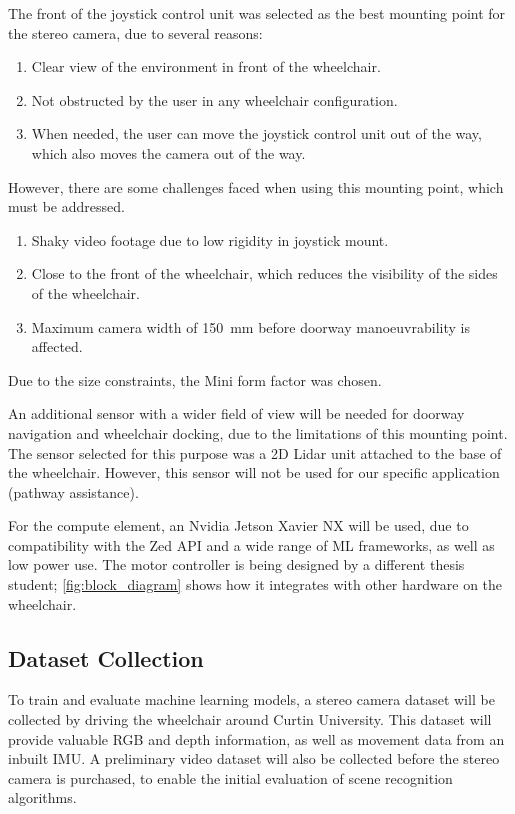 \documentclass[12pt]{article}
\begin{document}
The front of the joystick control unit was selected as the best mounting point for the
stereo camera, due to several reasons:
\begin{enumerate}[topsep=0pt,itemsep=-1ex,partopsep=1ex,parsep=1ex]
    \item Clear view of the environment in front of the wheelchair.
    \item Not obstructed by the user in any wheelchair configuration.
    \item When needed, the user can move the joystick control unit out of the way,
            which also moves the camera out of the way.
\end{enumerate}
However, there are some challenges faced when using this mounting point, which must be addressed.
\begin{enumerate}[topsep=0pt,itemsep=-1ex,partopsep=1ex,parsep=1ex]
    \item Shaky video footage due to low rigidity in joystick mount.
    \item Close to the front of the wheelchair, which reduces the visibility of the sides of the wheelchair.
    \item Maximum camera width of \SI{150}{\milli\metre} before doorway manoeuvrability is affected.
\end{enumerate}
Due to the size constraints, the Mini form factor was chosen.

An additional sensor with a wider field of view will be needed for doorway navigation
and wheelchair docking, due to the limitations of this mounting point. The sensor selected for this purpose
was a 2D Lidar unit attached to the base of the wheelchair. However, this sensor will not be used for
our specific application (pathway assistance).

For the compute element, an Nvidia Jetson Xavier NX will be used, due to compatibility with the Zed API
and a wide range of ML frameworks, as well as low power use.
The motor controller is being designed by a different thesis student; \cref{fig:block_diagram} shows
how it integrates with other hardware on the wheelchair.

\subsection{Dataset Collection}
To train and evaluate machine learning models, a stereo camera dataset will be collected by driving the wheelchair
around Curtin University. This dataset will provide valuable RGB and depth information, as well as movement data
from an inbuilt IMU. A preliminary video dataset will also be collected before the stereo camera is purchased,
to enable the initial evaluation of scene recognition algorithms.
\end{document}
